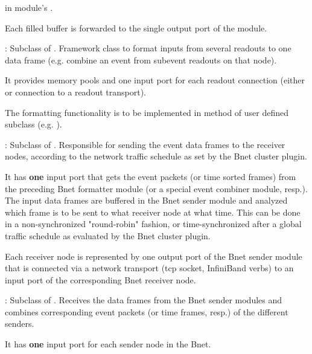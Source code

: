 \begin{compactdesc}
\begin{compactenum}
      in module's . 
  \item Each filled buffer is forwarded to the single output port of the module. 
\end{compactenum}
\item[\class{bnet::FormaterModule}] : Subclass of . 
   Framework class to format inputs from several readouts to one data 
   frame (e.g. combine an event from subevent readouts on that node). 
\begin{compactenum}
  \item It provides memory pools and one input port for each 
      readout connection (either  or connection to a 
      readout transport). 
  \item The formatting functionality is to be implemented in method 
       of user defined subclass (e.g. ).
\end{compactenum}
\item[\class{bnet::SenderModule}] : Subclass of . 
   Responsible for sending the event data frames to the receiver 
   nodes, according to the network traffic schedule as set by the Bnet cluster plugin.
\begin{compactenum}
  \item It has {\bf one} input port that gets the event packets 
      (or time sorted frames) from the preceding 
      Bnet formatter module (or a special event combiner module, resp.). 
      The input data frames are buffered in the Bnet sender module and analyzed 
      which frame is to be sent to what receiver node at what time. 
      This can be done in a non-synchronized "round-robin" fashion, 
      or time-synchronized after a global traffic schedule as evaluated by 
      the Bnet cluster plugin.  
  \item Each receiver node is represented by one output port of 
      the Bnet sender module that is connected via a network transport 
      (tcp socket, InfiniBand verbs) to an input port of the 
      corresponding Bnet receiver node.
\end{compactenum}
\item[\class{bnet::ReceiverModule}] : Subclass of . 
   Receives the data frames from the Bnet sender modules and 
   combines corresponding event packets (or time frames, resp.) of the different senders.
\begin{compactenum}
  \item It has {\bf one} input port for each sender node in the Bnet. 

\end{compactenum}
\end{compactdesc}
